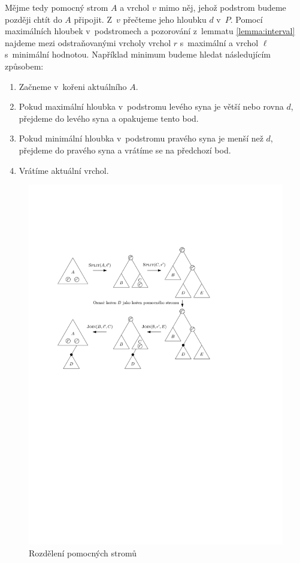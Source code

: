 Mějme tedy pomocný strom $A$ a vrchol $v$ mimo něj, jehož podstrom budeme později chtít do $A$ připojit. Z~$v$ přečteme jeho hloubku $d$ v~$P$. Pomocí maximálních hloubek v~podstromech a pozorování z~lemmatu \ref{lemma:interval} najdeme mezi odstraňovanými vrcholy vrchol $r$ s~maximální a vrchol $\ell$ s~minimální hodnotou. Například minimum budeme hledat následujícím způsobem:

\begin{enumerate}
\item Začneme v~kořeni aktuálního $A$.
\item Pokud maximální hloubka v~podstromu levého syna je větší nebo rovna $d$, přejdeme do levého syna a opakujeme tento bod.
\item Pokud minimální hloubka v~podstromu pravého syna je menší než $d$, přejdeme do pravého syna a vrátíme se na předchozí bod.
\item Vrátíme aktuální vrchol.
\end{enumerate}

\begin{figure}[h!]

  \centering
  \includegraphics[width=.9\linewidth]{../img/cut_tango}
\caption{Rozdělení pomocných stromů} 

\label{obr:cut_tango} 
 
\end{figure}


